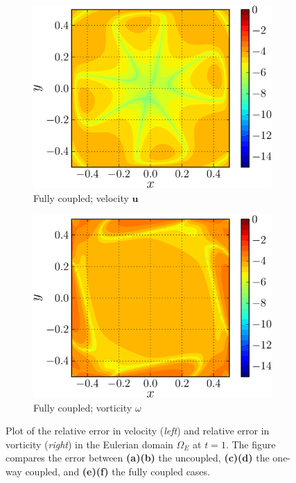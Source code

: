 \begin{figure}[!b]
     \begin{subfigure}[t]{0.45\textwidth}
             \includegraphics[width=\linewidth]{./figures/hybrid/lambOseent2/lambOseen_fully_vErrorFinal_compressed-crop.png}
             \caption{Fully coupled; velocity $\mathbf{u}$}
             \label{fig:lambOseen_fully_vErrorFinal}
     \end{subfigure}     
     \qquad
     \begin{subfigure}[t]{0.45\textwidth}
             \includegraphics[width=\linewidth]{./figures/hybrid/lambOseent2/lambOseen_fully_wErrorFinal_compressed-crop.png}
             \caption{Fully coupled; vorticity $\omega$}
             \label{fig:lambOseen_fully_wErrorFinal}
     \end{subfigure}        
     
     \caption{Plot of the relative error in velocity (\textit{left}) and relative error in vorticity (\textit{right}) in the Eulerian domain $\Omega_E$ at $t=1$. The figure compares the error between \textbf{(a)}\textbf{(b)} the uncoupled, \textbf{(c)}\textbf{(d)} the one-way coupled, and \textbf{(e)}\textbf{(f)} the fully coupled cases.}
     \label{fig:lambOseen_finalError}
	\end{figure}

